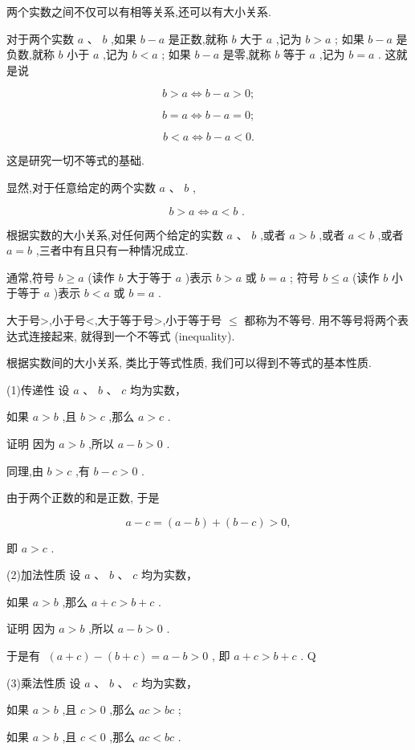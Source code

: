 \documentclass[a4paper,10pt,oneside,fontset=none]{ctexbook}
\renewcommand{\geq}{\geqslant}
\renewcommand{\leq}{\leqslant}
\numberwithin{equation}{chapter}
\begin{document}
两个实数之间不仅可以有相等关系,还可以有大小关系.

对于两个实数 $a\text{ 、 }b$ ,如果 $b - a$ 是正数,就称 $b$ 大于 $a$ ,记为 $b > a$ ; 如果 $b - a$ 是负数,就称 $b$ 小于 $a$ ,记为 $b < a$ ; 如果 $b - a$ 是零,就称 $b$ 等于 $a$ ,记为 $b = a$ . 这就是说

$$
b > a \Leftrightarrow  b - a > 0;
$$

$$
b = a \Leftrightarrow  b - a = 0;
$$

$$
b < a \Leftrightarrow  b - a < 0.
$$

这是研究一切不等式的基础.

显然,对于任意给定的两个实数 $a\text{ 、 }b$ ,

$$
b > a \Leftrightarrow  a < b\text{ . }
$$

根据实数的大小关系,对任何两个给定的实数 $a\text{ 、 }b$ ,或者 $a > b$ ,或者 $a < b$ ,或者 $a = b$ ,三者中有且只有一种情况成立.

通常,符号 $b \geq  a$ (读作 $b$ 大于等于 $a$ )表示 $b > a$ 或 $b = a$ ; 符号 $b \leq  a$ (读作 $b$ 小于等于 $a$ )表示 $b < a$ 或 $b = a$ .

大于号>,小于号<,大于等于号>,小于等于号 $\leq$ 都称为不等号. 用不等号将两个表达式连接起来, 就得到一个不等式 (inequality).

根据实数间的大小关系, 类比于等式性质, 我们可以得到不等式的基本性质.

(1)传递性 设 $a\text{ 、 }b\text{ 、 }c$ 均为实数，

如果 $a > b$ ,且 $b > c$ ,那么 $a > c$ .

证明 因为 $a > b$ ,所以 $a - b > 0$ .

同理,由 $b > c$ ,有 $b - c > 0$ .

由于两个正数的和是正数, 于是

$$
a - c = \left( {a - b}\right)  + \left( {b - c}\right)  > 0,
$$

即 $a > c$ .

(2)加法性质 设 $a\text{ 、 }b\text{ 、 }c$ 均为实数，

如果 $a > b$ ,那么 $a + c > b + c$ .

证明 因为 $a > b$ ,所以 $a - b > 0$ .

于是有 $\;\left( {a + c}\right)  - \left( {b + c}\right)  = a - b > 0$ , 即 $a + c > b + c$ . Q

(3)乘法性质 设 $a\text{ 、 }b\text{ 、 }c$ 均为实数，

如果 $a > b$ ,且 $c > 0$ ,那么 ${ac} > {bc}$ ;

如果 $a > b$ ,且 $c < 0$ ,那么 ${ac} < {bc}$ .
\end{document}

